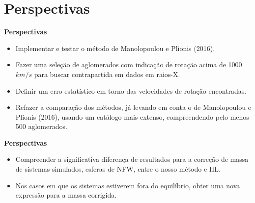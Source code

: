 \documentclass[xcolor=dvipsnames,10pt]{beamer}
\begin{document}
\section{Perspectivas}
\begin{frame}{\textbf{Perspectivas}}
  \begin{itemize}
    \item Implementar e testar o método de Manolopoulou e Plionis (2016).
    \item Fazer uma seleção de aglomerados com indicação de rotação acima de 1000 $km/s$ para buscar contrapartida em dados em raios-X.
    \item Definir um erro estatístico em torno das velocidades de rotação encontradas.
    \item Refazer a comparação dos métodos, já levando em conta o de Manolopoulou e Plionis (2016), usando um catálogo mais extenso, compreendendo pelo menos 500 aglomerados.
  \end{itemize}
\end{frame}

\begin{frame}{\textbf{Perspectivas}}
  \begin{itemize}
    \item Compreender a significativa diferença de resultados para a correção de massa de sistemas simulados, esferas de NFW, entre o nosso método e HL.
    \item Nos casos em que os sistemas estiverem fora do equilíbrio, obter uma nova expressão para a massa corrigida.
  \end{itemize}
\end{frame}
\end{document}
